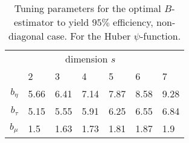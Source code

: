 \begin{table}[htbp!]
\begin{center}
{\small
\begin{tabular}{rllllll}
   \hline
  & \multicolumn{5}{c}{dimension $s$} \\
  \cline{2-7}
  & 2 & 3 & 4 & 5 & 6 & 7 \\
   \hline
$b_\eta$ & 5.66 & 6.41 & 7.14 & 7.87 & 8.58 & 9.28 \\
  $b_\tau$ & 5.15 & 5.55 & 5.91 & 6.25 & 6.55 & 6.84 \\
  $b_\mu$ & 1.5 & 1.63 & 1.73 & 1.81 & 1.87 & 1.9 \\
   \hline
\end{tabular}
}
\caption{Tuning parameters for the optimal $B$-estimator to yield $95\%$
  efficiency, non-diagonal case. For the Huber $\psi$-function.}
\label{tab:effBOptimal}
\end{center}
\end{table}

